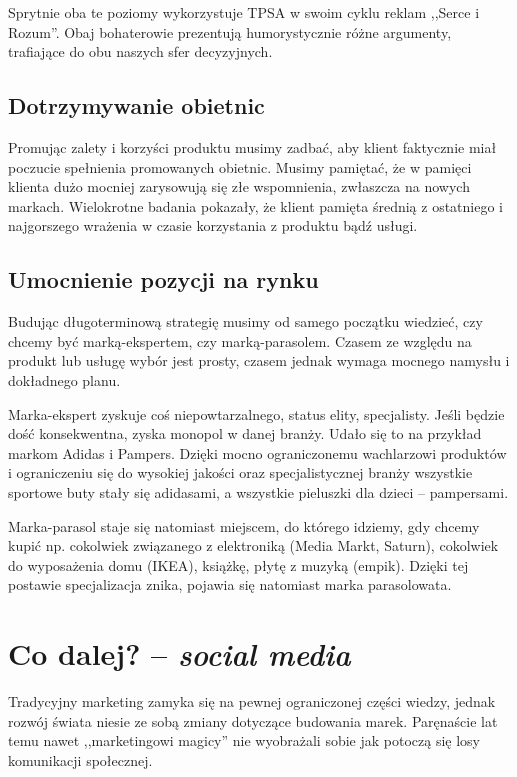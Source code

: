 \documentclass [a4paper, 11pt]{article}
\begin{document}
Sprytnie oba te poziomy wykorzystuje TPSA w swoim cyklu reklam ,,Serce i Rozum''. Obaj bohaterowie prezentują humorystycznie różne argumenty, trafiające do obu naszych sfer decyzyjnych.

\subsection{Dotrzymywanie obietnic}
Promując zalety i korzyści produktu musimy zadbać, aby klient faktycznie miał poczucie spełnienia promowanych obietnic. Musimy pamiętać, że w pamięci klienta dużo mocniej zarysowują się złe wspomnienia, zwłaszcza na nowych markach. Wielokrotne badania pokazały, że klient pamięta średnią z ostatniego i najgorszego wrażenia w czasie korzystania z produktu bądź usługi. \cite{wyklad2}

\subsection{Umocnienie pozycji na rynku}
Budując długoterminową strategię musimy od samego początku wiedzieć, czy chcemy być marką-ekspertem, czy marką-parasolem. Czasem ze względu na produkt lub usługę wybór jest prosty, czasem jednak wymaga mocnego namysłu i dokładnego planu.

Marka-ekspert zyskuje coś niepowtarzalnego, status elity, specjalisty. Jeśli będzie dość konsekwentna, zyska monopol w danej branży. Udało się to na przykład markom Adidas i Pampers. Dzięki mocno ograniczonemu wachlarzowi produktów i ograniczeniu się do wysokiej jakości oraz specjalistycznej branży wszystkie sportowe buty stały się adidasami, a wszystkie pieluszki dla dzieci -- pampersami.

Marka-parasol staje się natomiast miejscem, do którego idziemy, gdy chcemy kupić np. cokolwiek związanego z elektroniką (Media Markt, Saturn), cokolwiek do wyposażenia domu (IKEA), książkę, płytę z muzyką (empik). Dzięki tej postawie specjalizacja znika, pojawia się natomiast marka parasolowata.

\section{Co dalej? -- \emph{social media}}
Tradycyjny marketing zamyka się na pewnej ograniczonej części wiedzy, jednak rozwój świata niesie ze sobą zmiany dotyczące budowania marek. Paręnaście lat temu nawet ,,marketingowi magicy'' nie wyobrażali sobie jak potoczą się losy komunikacji społecznej.
\end{document}
